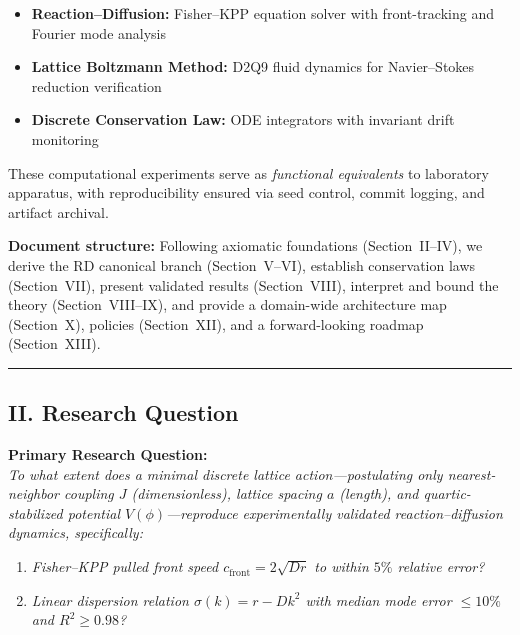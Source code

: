 \documentclass[
]{article}
\providecommand{\tightlist}{%
  \setlength{\itemsep}{0pt}\setlength{\parskip}{0pt}}
\begin{document}
\begin{itemize}
\tightlist
\item
  \textbf{Reaction--Diffusion:} Fisher--KPP equation solver with
  front-tracking and Fourier mode analysis
\item
  \textbf{Lattice Boltzmann Method:} D2Q9 fluid dynamics for
  Navier--Stokes reduction verification\\
\item
  \textbf{Discrete Conservation Law:} ODE integrators with invariant
  drift monitoring
\end{itemize}

These computational experiments serve as \emph{functional equivalents}
to laboratory apparatus, with reproducibility ensured via seed control,
commit logging, and artifact archival.

\textbf{Document structure:} Following axiomatic foundations (Section~II--IV),
we derive the RD canonical branch (Section~V--VI), establish conservation laws
(Section~VII), present validated results (Section~VIII), interpret and bound the
theory (Section~VIII--IX), and provide a domain-wide architecture map (Section~X),
policies (Section~XII), and a forward-looking roadmap (Section~XIII).

\begin{center}\rule{0.5\linewidth}{0.5pt}\end{center}

\hypertarget{ii.-research-question}{%
\subsection{II. Research Question}\label{ii.-research-question}}

\textbf{Primary Research Question:}\\
\emph{To what extent does a minimal discrete lattice
action---postulating only nearest-neighbor coupling \(J\)
(dimensionless), lattice spacing \(a\) (length), and quartic-stabilized
potential \(V(\phi)\)---reproduce experimentally validated
reaction--diffusion dynamics, specifically:}

\begin{enumerate}
\def\labelenumi{\arabic{enumi}.}
\tightlist
\item
  \emph{Fisher--KPP pulled front speed \(c_{\text{front}} = 2\sqrt{Dr}\)
  to within \(5\%\) relative error?}
\item
  \emph{Linear dispersion relation \(\sigma(k) = r - Dk^{2}\) with
  median mode error \(\le 10\%\) and \(R^{2} \ge 0.98\)?}
\end{enumerate}
\end{document}
